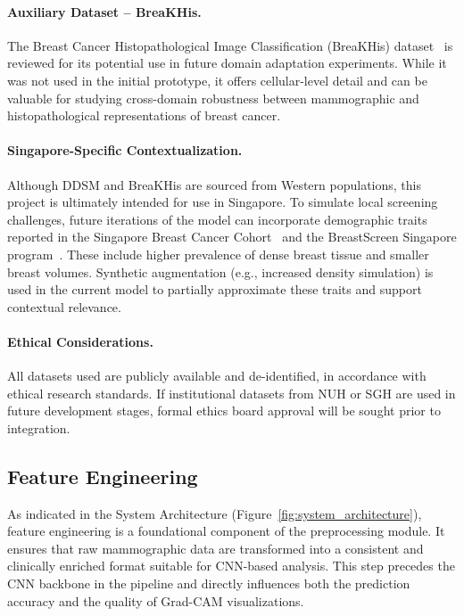 \documentclass[12pt]{article}
\begin{document}
\paragraph{Auxiliary Dataset – BreaKHis.}
The Breast Cancer Histopathological Image Classification (BreaKHis) dataset~\cite{18} is reviewed for its potential use in future domain adaptation experiments. While it was not used in the initial prototype, it offers cellular-level detail and can be valuable for studying cross-domain robustness between mammographic and histopathological representations of breast cancer.

\paragraph{Singapore-Specific Contextualization.}
Although DDSM and BreaKHis are sourced from Western populations, this project is ultimately intended for use in Singapore. To simulate local screening challenges, future iterations of the model can incorporate demographic traits reported in the Singapore Breast Cancer Cohort~\cite{6} and the BreastScreen Singapore program~\cite{19}. These include higher prevalence of dense breast tissue and smaller breast volumes. Synthetic augmentation (e.g., increased density simulation) is used in the current model to partially approximate these traits and support contextual relevance.

\paragraph{Ethical Considerations.}
All datasets used are publicly available and de-identified, in accordance with ethical research standards. If institutional datasets from NUH or SGH are used in future development stages, formal ethics board approval will be sought prior to integration.

\subsection{Feature Engineering}
\label{subsection:Feature Engineering}

As indicated in the System Architecture (Figure~\ref{fig:system_architecture}), feature engineering is a foundational component of the preprocessing module. It ensures that raw mammographic data are transformed into a consistent and clinically enriched format suitable for CNN-based analysis. This step precedes the CNN backbone in the pipeline and directly influences both the prediction accuracy and the quality of Grad-CAM visualizations.
\end{document}
